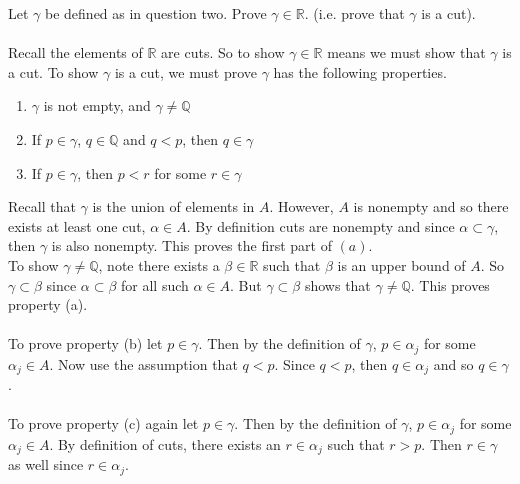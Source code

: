 \documentclass[12pt]{article}
\begin{document}
\problem 
Let $\gamma$ be defined as in question two. Prove $\gamma \in \mathbb{R}$. (i.e. prove that $\gamma$ is a cut). \\ \\
Recall the elements of $\mathbb{R}$ are cuts. So to show  $\gamma \in \mathbb{R}$ means we must show that $\gamma$ is a cut. To show $\gamma$ is a cut, we must prove $\gamma$ has the following properties.
\begin{enumerate}
\item $\gamma$ is not empty, and $\gamma \neq \mathbb{Q}$
\item If $p \in \gamma$, $q \in \mathbb{Q}$ and $q<p$, then $q \in \gamma$
\item If $p \in \gamma$, then $p<r$ for some $r \in \gamma$
\end{enumerate}
Recall that $\gamma$ is the union of elements in $A$. However, $A$ is nonempty and so there exists at least one cut, $\alpha \in A$. By definition cuts are nonempty and since $\alpha \subset \gamma$, then $\gamma$ is also nonempty. This proves the first part of $(a)$. \\
To show $\gamma \neq \mathbb{Q}$, note there exists a $\beta \in \mathbb{R}$ such that $\beta$ is an upper bound of $A$. So $\gamma \subset \beta$ since $\alpha \subset \beta$ for all such $\alpha \in A$. But $\gamma \subset \beta$ shows that $\gamma \neq \mathbb{Q}$. This proves property (a). \\ \\
To prove property (b) let $p \in \gamma$. Then by the definition of $\gamma$, $p \in \alpha_{j}$ for some $\alpha_{j} \in A$. Now use the assumption that $q<p$. Since $q<p$, then $q \in \alpha_{j}$ and so $q \in \gamma$. \\ \\
To prove property (c) again let $p \in \gamma$.  Then by the definition of $\gamma$, $p \in \alpha_{j}$ for some $\alpha_{j} \in A$. By definition of cuts, there exists an $r \in \alpha_{j}$ such that $r>p$. Then $r \in \gamma$ as well since $r \in \alpha_{j}$. \\ \\
\end{document}
